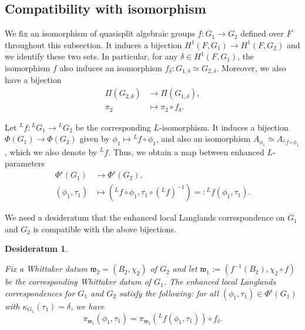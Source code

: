 \documentclass[11pt,letterpaper]{amsart}
\newcommand{\mfr}[1]{\mathfrak{#1}}
\newtheorem{desideratum}[thm]{Desideratum}
\renewcommand{\1}{\mathbbm{1}}
\numberwithin{equation}{section}
\begin{document}
{\subsection{Compatibility with isomorphism}\label{subsection: compatibility with isomorphism}
 We fix an isomorphism of quasisplit algebraic groups $f: G_1 \to G_2$ defined over $F$ throughout this subsection. It induces a bijection $ H^1(F,G_1) \to H^1(F,G_2)$ and we identify these two sets. In particular, for any $\delta \in H^1(F,G_1)$, the isomorphism $f$ also induces an isomorphism
$f_{\delta}: G_{1,\delta} \simeq G_{2, \delta}$. Moreover, we also have a bijection
\begin{align*}
    \Pi(G_{2,\delta}) & \to \Pi(G_{1,\delta}),\\
    \pi_2 & \mapsto \pi_2 \circ f_{\delta}.
\end{align*}



 Let ${}^L f: {}^L G_1 \to {}^L G_2$ be the corresponding $L$-isomorphism. It induces a bijection $\Phi(G_1) \to \Phi(G_2)$ given by $\phi_1 \mapsto {}^L f \circ \phi_1$, and also an isomorphism $ A_{\phi_1} \simeq A_{{}^L f \circ \phi_1}$, which we also denote by ${}^L f$. Thus, we obtain a map between enhanced $L$-parameters
 \begin{align*}
     \Phi^{\mfr{e}}(G_{1}) &\to  \Phi^{\mfr{e}}(G_2),\\
     (\phi_1,\tau_1) & \mapsto ({}^L f \circ \phi_1, \tau_1 \circ ({}^Lf)^{-1} )=: {}^Lf (\phi_1,\tau_1).
 \end{align*}


We need a desideratum that the enhanced local Langlands correspondence on $G_1$ and $G_2$ is compatible with the above bijections. 
\begin{desideratum}\label{desideratum: isomorphism}
    
   Fix a Whittaker datum $\mfr{w}_2=(B_2, \chi_2)$ of $G_2$ and let $\mfr{w}_1:= (f^{-1}(B_2), \chi_2 \circ f)$ be the corresponding Whittaker datum of $G_1$. The enhanced local Langlands correspondences for $G_1$ and $G_2$ satisfy the following: for all $(\phi_1, \tau_1) \in \Phi^{\mfr{e}}(G_1)$ with $\kappa_{G_1}(\tau_1)= \delta$, we have 
    \[ \pi_{\mfr{w}_1}(\phi_1,\tau_1)= \pi_{\mfr{w}_2}({}^Lf (\phi_1,\tau_1))   \circ f_{\delta}. \]
\end{desideratum}



}
\end{document}
